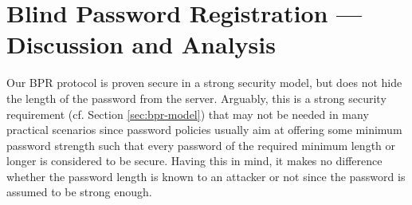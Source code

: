 \section{Blind Password Registration --- Discussion and Analysis} \label{sec:discussion}
Our \ac{BPR} protocol is proven secure in a strong security model, but does not hide the length of the password from the server. Arguably, this is a strong security requirement (cf. Section \ref{sec:bpr-model}) that may not be needed in many practical scenarios since password policies usually aim at offering some minimum password strength such that every password of the required minimum length or longer is considered to be secure.
Having this in mind, it makes no difference whether the password length is known to an attacker or not since the password is assumed to be strong enough.


